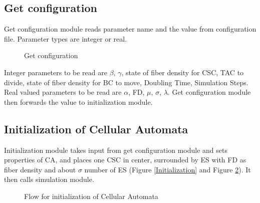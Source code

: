   \subsection{Get configuration}
  Get configuration module reads parameter name and the value from configuration file. 
  Parameter types are integer or real. 
  \begin{figure}[H]
	  \centering
	  \caption{Get configuration}
	  \label{GETCONFIGURATION}
  \end{figure}
  \noindent Integer parameters to be read are $\beta$, $\gamma$, state of fiber density for CSC, TAC to divide, state of fiber density for BC to move,
  Doubling Time, Simulation Steps. Real valued parameters to be read are $\alpha$, FD, $\mu$, $\sigma$, $\lambda$.
  Get configuration module then forwards the value to initialization module.

  
  \subsection{Initialization of Cellular Automata}
  
  Initialization module takes input from get configuration module and sets properties of CA, and places one CSC in center, 
  surrounded by ES with FD as fiber density and about $\sigma$ number of ES (Figure \ref{Initialization} and Figure \ref{InitializationFlowChart}).
  It then calls simulation module.
  
      \begin{figure}[H]
	  \centering
	  \caption{Flow for initialization of Cellular Automata}	
	  \label{InitializationFlowChart}
  \end{figure}   


